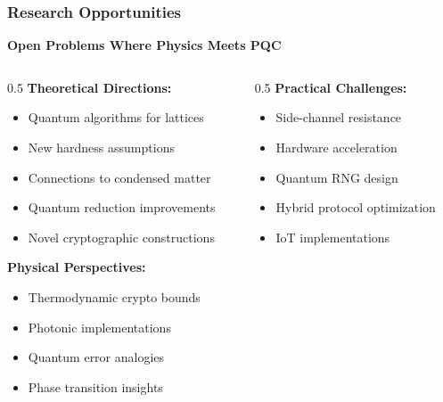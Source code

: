 \documentclass[aspectratio=169,10pt]{beamer}
\newcommand{\slideheader}[1]{\frametitle{#1}}
\theoremstyle{plain}
\begin{document}
\begin{frame}
  \slideheader{Research Opportunities}
  
  \begin{center}
    \textbf{\large Open Problems Where Physics Meets PQC}
  \end{center}
  
  \vspace{0.5cm}
  
  \begin{columns}
    \begin{column}{0.5\textwidth}
      \textbf{Theoretical Directions:}
      \begin{itemize}
        \item Quantum algorithms for lattices
        \item New hardness assumptions
        \item Connections to condensed matter
        \item Quantum reduction improvements
        \item Novel cryptographic constructions
      \end{itemize}
      
      \vspace{0.3cm}
      
      \textbf{Physical Perspectives:}
      \begin{itemize}
        \item Thermodynamic crypto bounds
        \item Photonic implementations
        \item Quantum error analogies
        \item Phase transition insights
      \end{itemize}
    \end{column}
    
    \begin{column}{0.5\textwidth}
      \textbf{Practical Challenges:}
      \begin{itemize}
        \item Side-channel resistance
        \item Hardware acceleration
        \item Quantum RNG design
        \item Hybrid protocol optimization
        \item IoT implementations
      \end{itemize}
      

\end{column}
\end{columns}
\end{frame}
\end{document}
